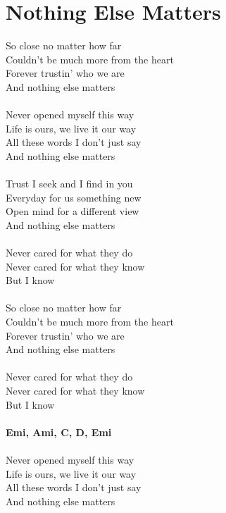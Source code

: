 \section{Nothing Else Matters}
\begin{multicols}{2}
So close no matter how far\\
Couldn't be much more from the heart\\
Forever trustin' who we are\\
And nothing else matters\\
\\
Never opened myself this way\\
Life is ours, we live it our way\\
All these words I don't just say\\
And nothing else matters\\
\\
Trust I seek and I find in you\\
Everyday for us something new\\
Open mind for a different view\\
And nothing else matters\\
\\
Never cared for what they do\\
Never cared for what they know\\
But I know\\
\\
So close no matter how far\\
Couldn't be much more from the heart\\
Forever trustin' who we are\\
And nothing else matters\\
\\
Never cared for what they do\\
Never cared for what they know\\
But I know\\
\\
\footnotesize\textbf{Emi, Ami, C, D, Emi}\\
\normalsize
\columnbreak
\\
Never opened myself this way\\
Life is ours, we live it our way\\
All these words I don't just say\\
And nothing else matters\\
\\

\end{multicols}
